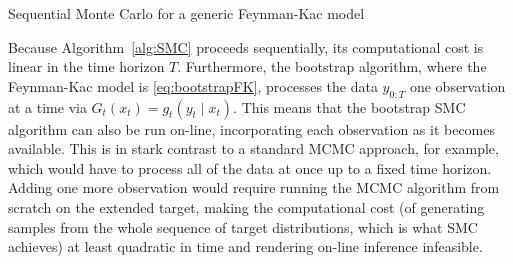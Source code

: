 \begin{algorithm}
\vspace*{10pt}
\DontPrintSemicolon
{}
\vspace*{10pt}
\caption{Sequential Monte Carlo for a generic Feynman-Kac model}
\label{alg:SMC}
\end{algorithm}

Because Algorithm~\ref{alg:SMC} proceeds sequentially, its computational cost is linear in the time horizon $T$. Furthermore, the bootstrap algorithm, where the Feynman-Kac model is \eqref{eq:bootstrapFK}, processes the data $y_{0:T}$ one observation at a time via $G_t(x_t) = g_t(y_t \mid x_t)$. This means that the bootstrap SMC algorithm can also be run on-line, incorporating each observation as it becomes available.
This is in stark contrast to a standard MCMC approach, for example, which would have to process all of the data at once up to a fixed time horizon. Adding one more observation would require running the MCMC algorithm from scratch on the extended target, making the computational cost (of generating samples from the whole sequence of target distributions, which is what SMC achieves) at least quadratic in time and rendering on-line inference infeasible.


